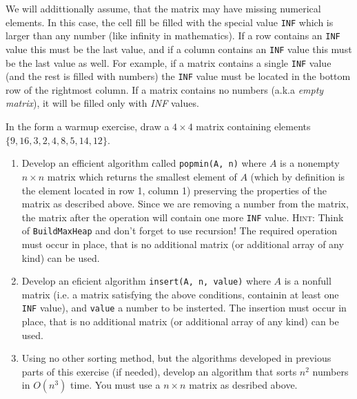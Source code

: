 \documentclass[12pt]{article}
\begin{document}
\vskip5pt

We will addittionally assume, that the matrix may have missing numerical elements. In this case, the cell fill be filled with the special value \texttt {INF} which is larger than any number (like infinity in mathematics). If a row contains an \texttt{INF} value this must be the last value, and if a column contains an \texttt{INF} value this must be the last value as well. For example, if a matrix contains a single \texttt{INF} value (and the rest is filled with numbers) the \texttt{INF} value must be located in the bottom row of the rightmost column. If a matrix contains no numbers (a.k.a \emph{empty matrix}), it will be filled only with \emph{INF} values.

\vskip5pt

In the form a warmup exercise, draw a $4\times 4$ matrix containing elements \\$\{9, 16, 3, 2, 4, 8, 5, 14, 12\}$.

\begin{enumerate}
	\item Develop an efficient algorithm called \texttt{popmin(A, n)} where $A$ is a nonempty $n\times n$ matrix which returns the smallest element of $A$ (which by definition is the element located in row 1, column 1) preserving the properties of the matrix as described above. Since we are removing a number from the matrix, the matrix after the operation will contain one more \texttt{INF} value. \textsc{Hint:} Think of \texttt{BuildMaxHeap} and don't forget to use recursion! The required operation must occur in place, that is no additional matrix (or additional array of any kind) can be used.
	
	\item Develop an eficient algorithm \texttt{insert(A, n, value)} where $A$ is a nonfull matrix (i.e. a matrix satisfying the above conditions, containin  at least one \texttt{INF} value), and \texttt{value} a number to be insterted. The insertion must occur in place, that is no additional matrix (or additional array of any kind) can be used.

	\item Using no other sorting method, but the algorithms developed in previous parts of this exercise (if needed), develop an algorithm that sorts $n^2$ numbers in $O(n^3)$ time. You must use a $n\times n$ matrix as desribed above.
\end{enumerate}



\end{document}
